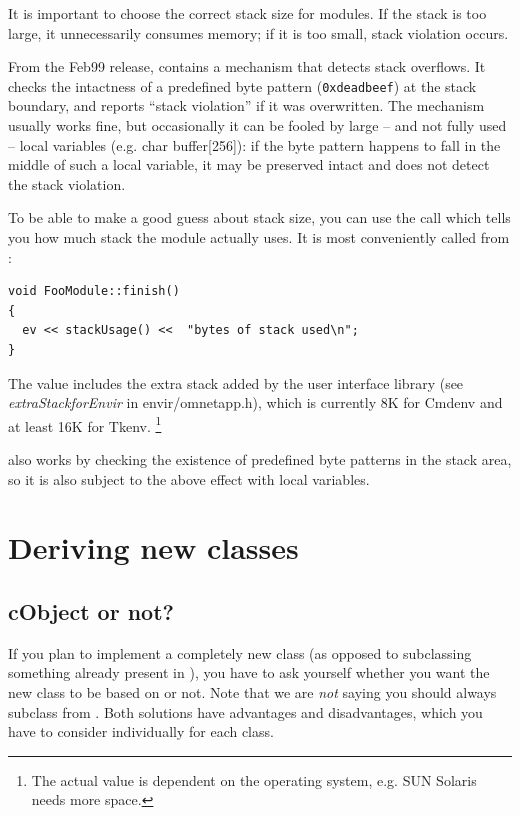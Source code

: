 It is important to choose the correct stack size for
modules.  If the stack is
too large, it unnecessarily consumes memory; if it is too small, stack
violation occurs.

From the Feb99 release, {\opp} contains a mechanism that detects stack
overflows. It checks the intactness of a
predefined byte pattern (\texttt{0xdeadbeef}) at the stack boundary,
and reports ``stack violation'' if it was
overwritten. The mechanism usually works fine, but occasionally it can
be fooled by large -- and not fully used -- local variables (e.g. char
buffer[256]): if the byte pattern happens to fall in the middle of
such a local variable, it may be preserved intact and {\opp} does not
detect the stack violation.

To be able to make a good guess about stack size, you can use
the  call which tells you how much stack the module
actually uses. It is most conveniently called from :

\begin{verbatim}
void FooModule::finish()
{
  ev << stackUsage() <<  "bytes of stack used\n";
}
\end{verbatim}


The value includes the extra stack added by the user interface library
(see \textit{extraStackforEnvir} in
envir/omnetapp.h), which is currently 8K for Cmdenv and at least 16K
for Tkenv.
  \footnote{The actual value is dependent on the operating
  system, e.g. SUN Solaris needs more space.}

also works by checking the existence of predefined
byte patterns in the stack area, so it is also subject to the above
effect with local variables.



\section{Deriving new classes}
\label{sec:ch-sim-lib:deriving-new-classes}

\subsection{cObject or not?}

If you plan to implement a completely new class (as opposed to
subclassing something already present in {\opp}), you have
to ask yourself whether you want the new class to be based
on  or not.
Note that we are \textit{not} saying you should always
subclass from .
Both solutions have advantages and disadvantages, which you
have to consider individually for each class.

